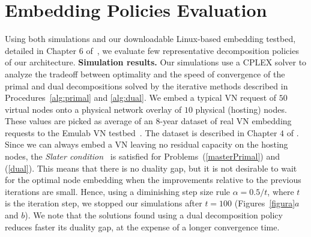 \documentclass[a4paper, 10pt, conference]{ieeeconf}
\begin{document}
\section{Embedding Policies Evaluation}\label{sec:eval}
\vspace{-1mm}
Using both simulations and our downloadable Linux-based embedding testbed, detailed in Chapter $6$ of~\cite{myPhDThesisTR}, we evaluate few representative decomposition policies of our architecture.
{\bf Simulation results.} Our simulations use a CPLEX solver to analyze the tradeoff between optimality and the speed of convergence of the primal and dual decompositions solved by the iterative methods described in Procedures~\ref{alg:primal} and \ref{alg:dual}.  We embed a typical VN request of $50$ virtual nodes onto a physical network overlay of $10$ physical (hosting) nodes. These values are picked as average of an $8$-year dataset of real VN embedding requests to the Emulab VN testbed~\cite{emulab}. The dataset is described in Chapter $4$ of \cite{myPhDThesisTR}.
Since we can always embed a VN leaving no residual capacity on the hosting nodes, the {\it Slater condition}~\cite{boyd-book} is satisfied for Problems~(\ref{masterPrimal}) and (\ref{dual}). This means that there is no duality gap, but it is not desirable to wait for the optimal node embedding when the improvements relative to the previous iterations are small. Hence, using a diminishing step size rule $\alpha=0.5/t$, where $t$ is the iteration step, we stopped our simulations after $t = 100$ (Figures~\ref{figura}$a$ and $b$). We note that the solutions found using a dual decomposition policy reduces faster its duality gap, at the expense of a longer convergence time.  
\end{document}
